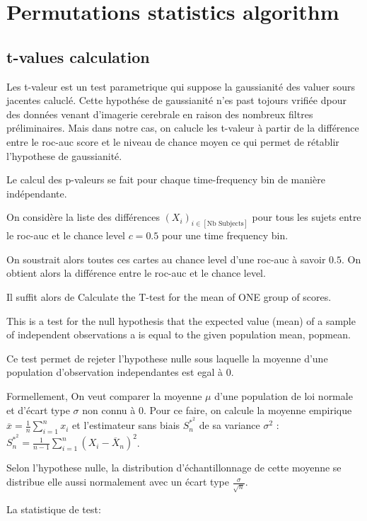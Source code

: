 \section{Permutations statistics algorithm}

\subsection{t-values calculation}

Les t-valeur est un test parametrique qui suppose la gaussianité des valuer sours jacentes caluclé. Cette hypothése de gaussianité n'es past tojours vrifiée dpour des données venant d'imagerie cerebrale en raison des nombreux filtres préliminaires. Mais dans notre cas, on calucle les t-valeur à partir de la différence entre le roc-auc score et le niveau de chance moyen ce qui permet de rétablir l'hypothese de gaussianité.

Le calcul des p-valeurs se fait pour chaque time-frequency bin de manière indépendante.

On considère la liste des différences $(X_i)_{i \in [\text{Nb Subjects}]}$ pour tous les sujets entre le roc-auc et le chance level $c=0.5$ pour une time frequency bin.

On soustrait alors toutes ces cartes au chance level d'une roc-auc à savoir $0.5$. On obtient alors la différence entre le roc-auc et le chance level.

Il suffit alors de Calculate the T-test for the mean of ONE group of scores.

This is a test for the null hypothesis that the expected value (mean) of a sample of independent observations a is equal to the given population mean, popmean.

Ce test permet de rejeter l'hypothese nulle sous laquelle la moyenne d'une population d'observation independantes est egal à $0$.

Formellement,
On veut comparer la moyenne $\mu$ d'une population de loi normale et d’écart type $\sigma$ non connu à $0$. Pour ce faire, on calcule la moyenne empirique $\overline{x} = \frac{1}{n}\sum_{i=1}^{n}x_i$ et l'estimateur  sans biais $S^{\ast ^2}_n$ de sa variance $\sigma^2$
:$S^{\ast ^2}_n = \frac{1}{n-1}\sum\limits_{i=1}^n (X_i - \overline X_n )^2$.

Selon l’hypothese nulle, la distribution d’échantillonnage de cette moyenne se distribue elle aussi normalement avec un écart type $\frac{\sigma}{\sqrt{n}}$.

La statistique de test:

